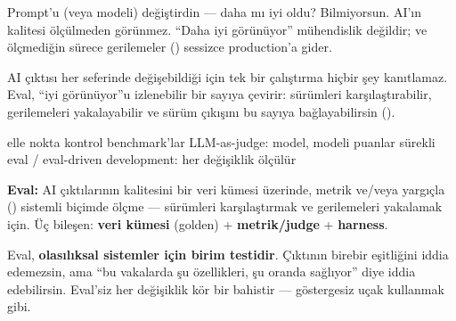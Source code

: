 

Prompt'u (veya modeli) değiştirdin --- daha mı iyi oldu? Bilmiyorsun. AI'ın
kalitesi ölçülmeden görünmez. ``Daha iyi görünüyor'' mühendislik değildir; ve
ölçmediğin sürece gerilemeler () sessizce production'a gider.


AI çıktısı her seferinde değişebildiği için tek bir çalıştırma hiçbir şey
kanıtlamaz. Eval, ``iyi görünüyor''u izlenebilir bir sayıya çevirir: sürümleri
karşılaştırabilir, gerilemeleri yakalayabilir ve sürüm çıkışını bu sayıya
bağlayabilirsin ().

\begin{timeline}
 elle nokta kontrol \tlsep {} benchmark'lar \tlsep {} LLM-as-judge: model, modeli puanlar \tlsep {} sürekli eval / eval-driven development: her değişiklik ölçülür
\end{timeline}

\begin{problembox}
\textbf{Eval:} AI çıktılarının kalitesini bir veri kümesi üzerinde, metrik
ve/veya yargıçla () sistemli biçimde ölçme --- sürümleri karşılaştırmak
ve gerilemeleri yakalamak için. Üç bileşen: \textbf{veri kümesi} (golden) +
\textbf{metrik/judge} + \textbf{harness}.
\end{problembox}

\begin{mentalbox}
Eval, \textbf{olasılıksal sistemler için birim testidir}. Çıktının birebir
eşitliğini iddia edemezsin, ama ``bu vakalarda şu özellikleri, şu oranda
sağlıyor'' diye iddia edebilirsin. Eval'siz her değişiklik kör bir bahistir ---
göstergesiz uçak kullanmak gibi.
\end{mentalbox}

